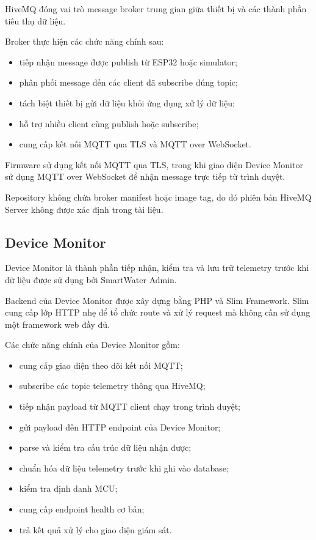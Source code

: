 HiveMQ đóng vai trò message broker trung gian giữa thiết bị và các thành phần
tiêu thụ dữ liệu.

Broker thực hiện các chức năng chính sau:

\begin{itemize}
    \item tiếp nhận message được publish từ ESP32 hoặc simulator;
    \item phân phối message đến các client đã subscribe đúng topic;
    \item tách biệt thiết bị gửi dữ liệu khỏi ứng dụng xử lý dữ liệu;
    \item hỗ trợ nhiều client cùng publish hoặc subscribe;
    \item cung cấp kết nối MQTT qua TLS và MQTT over WebSocket.
\end{itemize}

Firmware sử dụng kết nối MQTT qua TLS, trong khi giao diện Device Monitor sử
dụng MQTT over WebSocket để nhận message trực tiếp từ trình duyệt.

Repository không chứa broker manifest hoặc image tag, do đó phiên bản HiveMQ
Server không được xác định trong tài liệu.

\subsection{Device Monitor}

Device Monitor là thành phần tiếp nhận, kiểm tra và lưu trữ telemetry trước khi
dữ liệu được sử dụng bởi SmartWater Admin.

Backend của Device Monitor được xây dựng bằng PHP và Slim Framework. Slim cung
cấp lớp HTTP nhẹ để tổ chức route và xử lý request mà không cần sử dụng một
framework web đầy đủ.

Các chức năng chính của Device Monitor gồm:

\begin{itemize}
    \item cung cấp giao diện theo dõi kết nối MQTT;
    \item subscribe các topic telemetry thông qua HiveMQ;
    \item tiếp nhận payload từ MQTT client chạy trong trình duyệt;
    \item gửi payload đến HTTP endpoint của Device Monitor;
    \item parse và kiểm tra cấu trúc dữ liệu nhận được;
    \item chuẩn hóa dữ liệu telemetry trước khi ghi vào database;
    \item kiểm tra định danh MCU;
    \item cung cấp endpoint health cơ bản;
    \item trả kết quả xử lý cho giao diện giám sát.
\end{itemize}

